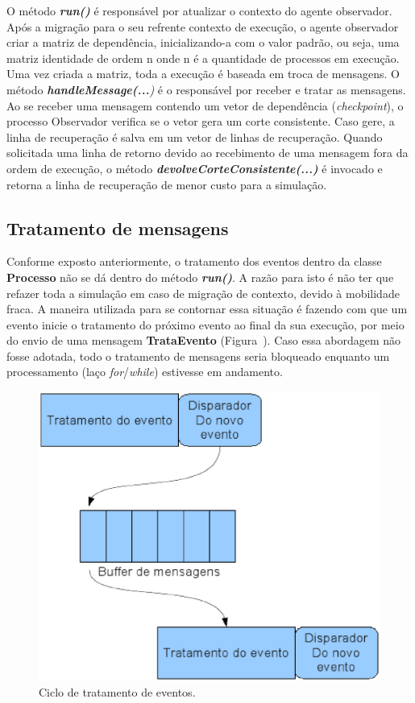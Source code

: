 O método \textit{\textbf{run()}} é responsável por atualizar o contexto do agente observador. Após a migração para o seu refrente contexto de execução, o agente observador criar a matriz de dependência, inicializando-a com o valor padrão, ou seja, uma matriz identidade de ordem n onde n é a quantidade de processos em execução. Uma vez criada a matriz, toda a execução é baseada em troca de mensagens. O método  \textit{\textbf{handleMessage(...})} é o responsável por receber e tratar as mensagens. Ao se receber uma mensagem contendo um vetor de dependência (\textit{checkpoint}), o processo Observador verifica se o vetor gera um corte consistente. Caso gere, a linha de recuperação é salva em um vetor de linhas de recuperação. Quando solicitada uma linha de retorno devido ao recebimento de uma mensagem fora da ordem de execução, o método \textit{\textbf{devolveCorteConsistente(...)}} é invocado e retorna a linha de recuperação de menor custo para a simulação.


\subsection{Tratamento de mensagens}

Conforme exposto anteriormente, o tratamento dos eventos dentro da classe \textbf{Processo} não se dá dentro do método \textbf{\textit{run()}}. A razão para isto é não ter que refazer toda a simulação em caso de migração de contexto, devido à mobilidade fraca. A maneira utilizada para se contornar essa situação é fazendo com que um evento inicie o tratamento do próximo evento ao final da sua execução, por meio do envio de uma mensagem \textbf{TrataEvento} (Figura~\cite{fig:trata_evento}). Caso essa abordagem não fosse adotada, todo o tratamento de mensagens seria bloqueado enquanto um processamento (laço \textit{for}/\textit{while}) estivesse em andamento.

\begin{figure}[htb]
  \centering
  \centerline{\includegraphics[scale=0.6]{imagens/trata_evento.eps}}
  \caption{ Ciclo de tratamento de eventos.}
\label{fig:trata_evento}
\end{figure}


